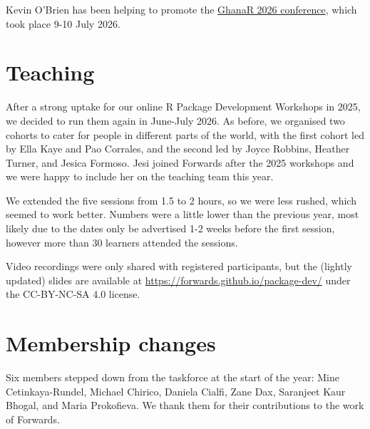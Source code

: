 Kevin O'Brien has been helping to promote the \href{https://ghana-rusers.org/events/?event=6521}{GhanaR 2026 conference}, which took place
9-10 July 2026.

\section{Teaching}\label{teaching}

After a strong uptake for our online R Package Development Workshops in 2025,
we decided to run them again in June-July 2026. As before, we organised two cohorts to
cater for people in different parts of the world, with the first cohort
led by Ella Kaye and Pao Corrales, and the second led by Joyce Robbins,
Heather Turner, and Jesica Formoso. Jesi joined Forwards after the 2025 workshops
and we were happy to include her on the teaching team this year.

We extended the five sessions from 1.5 to 2 hours, so we were less rushed,
which seemed to work better. Numbers were a little lower than the previous year,
most likely due to the dates only be advertised 1-2 weeks before the first
session, however more than 30 learners attended the sessions.

Video recordings were only shared with registered participants, but
the (lightly updated) slides are available at \url{https://forwards.github.io/package-dev/}
under the CC-BY-NC-SA 4.0 license.

\section{Membership changes}\label{membership-changes}

Six members stepped down from the taskforce at the start of the year: Mine
Cetinkaya-Rundel, Michael Chirico, Daniela Cialfi, Zane Dax, Saranjeet Kaur
Bhogal, and Maria Prokofieva. We thank them for their contributions to the
work of Forwards.


\address{%
Heather Turner\\
University of Birmingham\\%
Birmingham, United Kingdom\\
%
\url{https://www.heatherturner.net/}\\%
\textit{ORCiD: \href{https://orcid.org/0000-0002-1256-3375}{0000-0002-1256-3375}}\\%
\href{mailto:heather.turner@r-project.org}{\nolinkurl{heather.turner@r-project.org}}%
}
